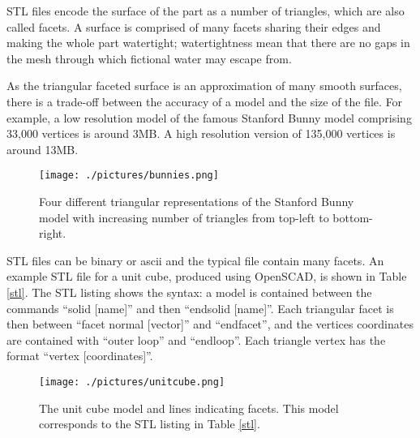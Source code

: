STL files encode the surface of the part as a number of triangles, which are also called facets. A surface is comprised of many facets sharing their edges and making the whole part watertight; watertightness mean that there are no gaps in the mesh through which fictional water may escape from. 

As the triangular faceted surface is an approximation of many smooth surfaces, there is a trade-off between the accuracy of a model and the size of the file. For example, a low resolution model of the famous Stanford Bunny model comprising 33,000 vertices is around 3MB. A high resolution version of 135,000 vertices is around 13MB. 

\begin{figure}[h!]
 \centering
 \texttt{[image: ./pictures/bunnies.png]}
 \caption{Four different triangular representations of the Stanford Bunny model with increasing number of triangles from top-left to bottom-right.}
 \label{fig:bunnies}
\end{figure}


STL files can be binary or ascii and the typical file contain many facets. An example STL file for a unit cube, produced using OpenSCAD, is shown in Table \ref{stl}. The STL listing shows the syntax: a model is contained between the commands ``solid [name]'' and then ``endsolid [name]''. Each triangular facet is then between ``facet normal [vector]'' and ``endfacet'', and the vertices coordinates are contained with ``outer loop'' and ``endloop''. Each triangle vertex has the format ``vertex [coordinates]''. 

\begin{figure}[ht!]
 \centering
 \texttt{[image: ./pictures/unitcube.png]}
 \caption{The unit cube model and lines indicating facets. This model corresponds to the STL listing in Table \ref{stl}.}
 \label{fig:unitcube}
\end{figure}


